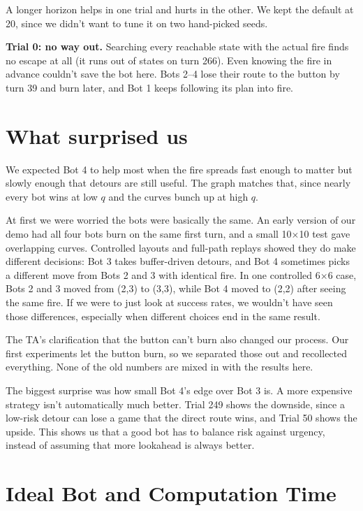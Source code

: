 \documentclass[11pt]{article}
\begin{document}
A longer horizon helps in one trial and hurts in the other. We kept the default at 20, since we didn't want to tune it on two hand-picked seeds.

\textbf{Trial 0: no way out.} Searching every reachable state with the actual fire finds no escape at all (it runs out of states on turn 266). Even knowing the fire in advance couldn't save the bot here. Bots 2--4 lose their route to the button by turn 39 and burn later, and Bot 1 keeps following its plan into fire.

\section{What surprised us}

We expected Bot 4 to help most when the fire spreads fast enough to matter but slowly enough that detours are still useful. The graph matches that, since nearly every bot wins at low $q$ and the curves bunch up at high $q$.

At first we were worried the bots were basically the same. An early version of our demo had all four bots burn on the same first turn, and a small 10$\times$10 test gave overlapping curves. Controlled layouts and full-path replays showed they do make different decisions: Bot 3 takes buffer-driven detours, and Bot 4 sometimes picks a different move from Bots 2 and 3 with identical fire. In one controlled 6$\times$6 case, Bots 2 and 3 moved from (2,3) to (3,3), while Bot 4 moved to (2,2) after seeing the same fire. If we were to just look at success rates, we wouldn't have seen those differences, especially when different choices end in the same result.

The TA's clarification that the button can't burn also changed our process. Our first experiments let the button burn, so we separated those out and recollected everything. None of the old numbers are mixed in with the results here.

The biggest surprise was how small Bot 4's edge over Bot 3 is. A more expensive strategy isn't automatically much better. Trial 249 shows the downside, since a low-risk detour can lose a game that the direct route wins, and Trial 50 shows the upside. This shows us that a good bot has to balance risk against urgency, instead of assuming that more lookahead is always better.

\section{Ideal Bot and Computation Time}
\end{document}
